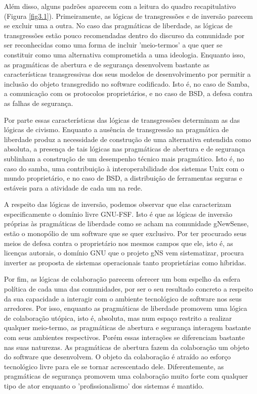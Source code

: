 Além disso, alguns padrões aparecem com a leitura do quadro recapitulativo (Figura \ref{fig3.1}). Primeiramente, as lógicas de transgressões e de inversão parecem se excluir uma a outra. No caso das pragmáticas de liberdade, as lógicas de transgressões estão pouco recomendadas dentro do discurso da comunidade por ser reconhecidas como uma forma de incluir 'meio-termos' a que quer se constituir como uma alternativa comprometida a uma ideologia. Enquanto isso, as pragmáticas de abertura e de segurança desenvolvem bastante as características transgressivas dos seus modelos de desenvolvimento por permitir a inclusão do objeto transgredido no software codificado. Isto é, no caso de Samba, a comunicação com os protocolos proprietários, e no caso de BSD, a defesa contra as falhas de segurança.

Por parte essas características das lógicas de transgressões determinam as das lógicas de civismo. Enquanto a ausência de transgressão na pragmática de liberdade produz a necessidade de construção de uma alternativa entendida como absoluta, a presença de tais lógicas nas pragmáticas de abertura e de segurança sublinham a construção de um desempenho técnico mais pragmático. Isto é, no caso do samba, uma contribuição à interoperabilidade dos sistemas Unix com o mundo proprietário, e no caso de BSD, a distribuição de ferramentas seguras e estáveis para a atividade de cada um na rede.

A respeito das lógicas de inversão, podemos observar que elas caracterizam especificamente o domínio livre GNU-FSF. Isto é que as lógicas de inversão próprias às pragmáticas de liberdade como se acham na comunidade gNewSense, estão o monopólio de um software que se quer exclusivo. Por ter procurado seus meios de defesa contra o proprietário nos mesmos campos que ele, isto é, as licenças autorais, o domínio GNU que o projeto gNS vem sistematizar, procura inverter as proposta de sistemas operacionais tanto proprietárias como híbridas. 

Por fim, as lógicas de colaboração parecem oferecer um bom espelho da esfera política de cada uma das comunidades, por ser o seu resultado concreto a respeito da sua capacidade a interagir com o ambiente tecnológico de software nos seus arredores. Por isso, enquanto as pragmáticas de liberdade promovem uma lógica de colaboração utópica, isto é, absoluta, mas num espaço restrito a realizar qualquer meio-termo, as pragmáticas de abertura e segurança interagem bastante com seus ambientes respectivos. Porém essas interações se diferenciam bastante nas suas naturezas. As pragmáticas de abertura fazem da colaboração um objeto do software que desenvolvem. O objeto da colaboração é atraído ao esforço tecnológico livre para ele se tornar acrescentado dele. Diferentemente, as pragmáticas de segurança promovem uma colaboração muito forte com qualquer tipo de ator enquanto o 'profissionalismo' dos sistemas é mantido.

